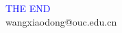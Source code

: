 \documentclass[compress,table]{beamer} %
\begin{document}
\begin{frame}
\centering
{\Huge \textcolor{blue}{THE END}} \\
\vspace{5mm}
{\Large wangxiaodong@ouc.edu.cn} \\
\end{frame}
\end{document}
